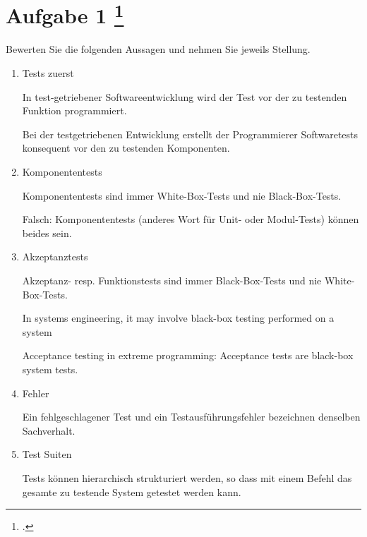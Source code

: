 \documentclass{lehramt-informatik-aufgabe}
\begin{document}
\section{Aufgabe 1
\footcite{66116:2019:03}}

Bewerten Sie die folgenden Aussagen und nehmen Sie jeweils Stellung.

\begin{enumerate}

\item Tests zuerst

In test-getriebener Softwareentwicklung wird der Test vor der zu
testenden Funktion programmiert.

\begin{liAntwort}
Bei der testgetriebenen Entwicklung erstellt der Programmierer
Softwaretests konsequent vor den zu testenden Komponenten.
\end{liAntwort}


\item Komponententests

Komponententests sind immer White-Box-Tests und nie Black-Box-Tests.

\begin{liAntwort}
Falsch: Komponententests (anderes Wort für Unit- oder Modul-Tests) können beides sein.
\end{liAntwort}


\item Akzeptanztests

Akzeptanz- resp. Funktionstests sind immer Black-Box-Tests und nie
White-Box-Tests.

\begin{liAntwort}
In systems engineering, it may involve black-box testing performed on a system

Acceptance testing in extreme programming:  Acceptance tests are black-box system tests.

\end{liAntwort}


\item Fehler

Ein fehlgeschlagener Test und ein Testausführungsfehler bezeichnen
denselben Sachverhalt.


\item Test Suiten

Tests können hierarchisch strukturiert werden, so dass mit einem Befehl
das gesamte zu testende System getestet werden kann.

\end{enumerate}
\end{document}
